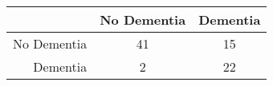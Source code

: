 \begin{table}[ht]
\centering
\begin{tabular}{r|c|c}
  \hline
 & No Dementia & Dementia \\ 
  \hline
No Dementia & 41 & 15 \\ 
  Dementia & 2 & 22 \\ 
   \hline
\end{tabular}
\end{table}
